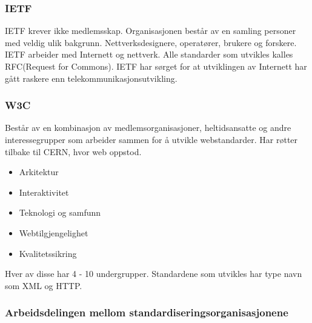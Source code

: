 \documentclass{article}
\begin{document}
\begin{flushleft}
        \subsubsection{IETF}
        IETF krever ikke medlemsskap. Organisasjonen består av en samling personer med veldig ulik bakgrunn. 
        Nettverksdesignere, operatører, brukere og forskere. 
        IETF arbeider med Internett og nettverk. Alle standarder som utvikles kalles RFC(Request for Commons). 
        IETF har sørget for at utviklingen av Internett har gått raskere enn telekommunikasjonsutvikling.

        \subsubsection{W3C}
        Består av en kombinasjon av medlemsorganisasjoner, heltidsansatte og andre interessegrupper som arbeider sammen for å utvikle webstandarder.
        Har røtter tilbake til CERN, hvor web oppstod. 
        \begin{itemize}
            \item Arkitektur
            \item Interaktivitet
            \item Teknologi og samfunn
            \item Webtilgjengelighet
            \item Kvalitetssikring
        \end{itemize}
        Hver av disse har 4 - 10 undergrupper. Standardene som utvikles har type navn som XML og HTTP.

        \subsubsection{Arbeidsdelingen mellom standardiseringsorganisasjonene}
        

        


        

    \end{flushleft}
\end{document}
